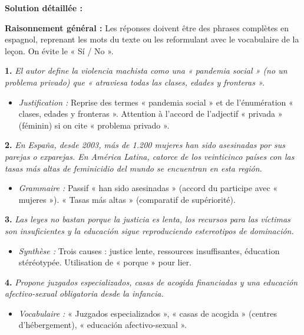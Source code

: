 \documentclass[11pt]{article}
\begin{document}
\begin{exoresolu}
\tcblower
\textbf{Solution détaillée :}

\textbf{Raisonnement général :} Les réponses doivent être des phrases complètes en espagnol, reprenant les mots du texte ou les reformulant avec le vocabulaire de la leçon. On évite le « Sí / No ».

\textbf{1.} \emph{El autor define la violencia machista como una « pandemia social » (no un problema privado) que « atraviesa todas las clases, edades y fronteras ».}
\begin{itemize}
    \item \textit{Justification :} Reprise des termes « pandemia social » et de l'énumération « clases, edades y fronteras ». Attention à l'accord de l'adjectif « privada » (féminin) si on cite « problema privado ».
\end{itemize}

\textbf{2.} \emph{En España, desde 2003, más de 1.200 mujeres han sido asesinadas por sus parejas o exparejas. En América Latina, catorce de los veinticinco países con las tasas más altas de feminicidio del mundo se encuentran en esta región.}
\begin{itemize}
    \item \textit{Grammaire :} Passif « han sido asesinadas » (accord du participe avec « mujeres »). « Tasas más altas » (comparatif de supériorité).
\end{itemize}

\textbf{3.} \emph{Las leyes no bastan porque la justicia es lenta, los recursos para las víctimas son insuficientes y la educación sigue reproduciendo estereotipos de dominación.}
\begin{itemize}
    \item \textit{Synthèse :} Trois causes : justice lente, ressources insuffisantes, éducation stéréotypée. Utilisation de « porque » pour lier.
\end{itemize}

\textbf{4.} \emph{Propone juzgados especializados, casas de acogida financiadas y una educación afectivo-sexual obligatoria desde la infancia.}
\begin{itemize}
    \item \textit{Vocabulaire :} « Juzgados especializados », « casas de acogida » (centres d'hébergement), « educación afectivo-sexual ».
\end{itemize}


\end{exoresolu}
\end{document}
